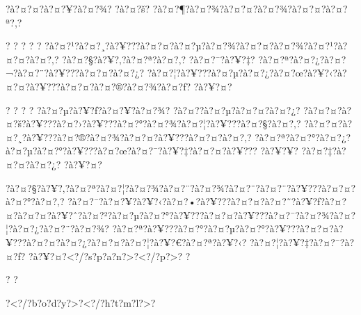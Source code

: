 \documentclass[11pt, openany]{book}
\begin{document}
{{{{{{{{{{{{{{{{{{?à?¤?¤?à?¤?¥?à?¤?¾? ?à?¤?š? ?à?¤?¶?à?¤?¾?à?¤?¤?à?¤?¾?à?¤?¤?à?¤?ª?,?

? ? ? ? ?
?à?¤?¹?à?¤?¸?à?¥???à?¤?¤?à?¤?µ?à?¤?¾?à?¤?¤?à?¤?¾?à?¤?¹?à?¤?¤?à?¤?‚?
?à?¤?§?à?¥?‚?à?¤?ª?à?¤?‚? ?à?¤?¯?à?¥?‡?
?à?¤?ª?à?¤?¿?à?¤?¬?à?¤?¨?à?¥???à?¤?¤?à?¤?¿?
?à?¤?¦?à?¥???à?¤?µ?à?¤?¿?à?¤?œ?à?¥?‹?à?¤?¤?à?¥???à?¤?¤?à?¤?®?à?¤?¾?à?¤?ƒ?
?à?¥?¤?

? ? ? ? ?à?¤?µ?à?¥?ƒ?à?¤?¥?à?¤?¾? ?à?¤?­?à?¤?µ?à?¤?¤?à?¤?¿?
?à?¤?¤?à?¤?š?à?¥???à?¤?›?à?¥???à?¤?°?à?¤?¾?à?¤?¦?à?¥???à?¤?§?à?¤?‚?
?à?¤?¤?à?¤?¸?à?¥???à?¤?®?à?¤?¾?à?¤?¤?à?¥???à?¤?¤?à?¤?‚?
?à?¤?ª?à?¤?°?à?¤?¿?à?¤?µ?à?¤?°?à?¥???à?¤?œ?à?¤?¯?à?¥?‡?à?¤?¤?à?¥???
?à?¥?¥? ?à?¤?‡?à?¤?¤?à?¤?¿? ?à?¥?¤?

?à?¤?§?à?¥?‚?à?¤?ª?à?¤?¦?à?¤?¾?à?¤?¨?à?¤?¾?à?¤?¨?à?¤?¨?à?¥???à?¤?¤?à?¤?°?à?¤?‚?
?à?¤?¯?à?¤?¥?à?¥?‹?à?¤?•?à?¥???à?¤?¤?à?¤?˜?à?¥?ƒ?à?¤?¤?à?¤?¤?à?¥?ˆ?à?¤?²?à?¤?µ?à?¤?°?à?¥???à?¤?¤?à?¥???à?¤?¯?à?¤?¾?à?¤?¦?à?¤?¿?à?¤?¨?à?¤?¾?
?à?¤?ª?à?¥???à?¤?°?à?¤?µ?à?¤?°?à?¥???à?¤?¤?à?¥???à?¤?¤?à?¤?¿?à?¤?¤?à?¤?¦?à?¥?€?à?¤?ª?à?¥?‹?
?à?¤?¦?à?¥?‡?à?¤?¯?à?¤?ƒ?
?à?¥?¤?\textless{}?/?s?p?a?n?\textgreater{}?\textless{}?/?p?\textgreater{}?
?

? ?

?\textless{}?/?b?o?d?y?\textgreater{}?\textless{}?/?h?t?m?l?\textgreater{}?

}}}}}}}}}}}}}}}}}}
\end{document}
